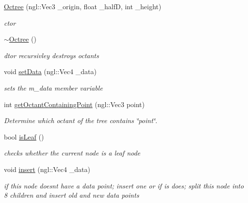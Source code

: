 \begin{DoxyCompactItemize}
\item 
\hyperlink{classOctree_a18c97528102fc6c7b0afcf62d4256d6b}{Octree} (ngl::Vec3 \_\-origin, float \_\-halfD, int \_\-height)
\begin{DoxyCompactList}\small\item\em ctor \item\end{DoxyCompactList}\item 
\hyperlink{classOctree_a6705a6ae06fab5a0dfdd79f45576020d}{$\sim$Octree} ()
\begin{DoxyCompactList}\small\item\em dtor recursivley destroys octants \item\end{DoxyCompactList}\item 
void \hyperlink{classOctree_a5e902807821df11683179aea5e43d731}{setData} (ngl::Vec4 \_\-data)
\begin{DoxyCompactList}\small\item\em sets the m\_\-data member variable \item\end{DoxyCompactList}\item 
int \hyperlink{classOctree_adb4be848e01fce3568b83cd8a4117e26}{getOctantContainingPoint} (ngl::Vec3 point)
\begin{DoxyCompactList}\small\item\em Determine which octant of the tree contains \char`\"{}point\char`\"{}. \item\end{DoxyCompactList}\item 
bool \hyperlink{classOctree_a5311ba068ebb82dbc917e0178f052ec0}{isLeaf} ()
\begin{DoxyCompactList}\small\item\em checks whether the current node is a leaf node \item\end{DoxyCompactList}\item 
void \hyperlink{classOctree_a9a1092104eeea9725e66ae188b8db736}{insert} (ngl::Vec4 \_\-data)
\begin{DoxyCompactList}\small\item\em if this node doesnt have a data point; insert one or if is does; split this node into 8 children and insert old and new data points \item\end{DoxyCompactList}\item 

\end{DoxyCompactItemize}
